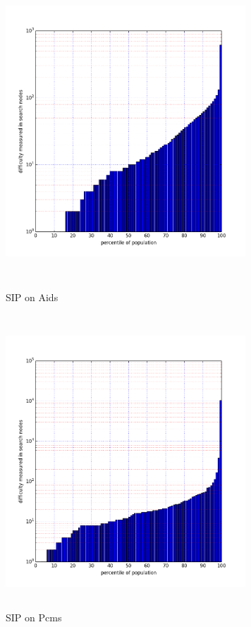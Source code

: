 \documentclass{l4proj}
\begin{document}
\begin{figure}
\centering
\begin{minipage}[t]{.5\textwidth}
  \centering
  \includegraphics[height=11cm,width=9cm]{images/plots/aidsPercentileLog.png}
  \caption{SIP on Aids}
  \label{aidsNodes}
\end{minipage}%
\begin{minipage}[t]{.5\textwidth}
  \centering
  \includegraphics[height=11cm,width=9cm]{images/plots/pcmsPercentileLog.png}
  \caption{SIP on Pcms}
  \label{pcmsNodes}
\end{minipage}
\end{figure}
\end{document}
